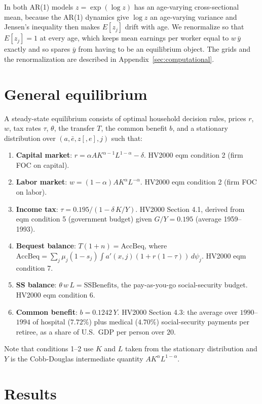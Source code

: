\documentclass[11pt,fleqn]{article}
\begin{document}
In both AR(1) models $z=\exp(\log z)$ has an age-varying cross-sectional mean, because the AR(1) dynamics give $\log z$ an age-varying variance and Jensen's inequality then makes $E[z_j]$ drift with age. We renormalize so that $E[z_j]=1$ at every age, which keeps mean earnings per worker equal to $w\, \bar{y}$ exactly and so spares $\bar{y}$ from having to be an equilibrium object. The grids and the renormalization are described in Appendix~\ref{sec:computational}.


\section{General equilibrium}\label{sec:ge}

A steady-state equilibrium consists of optimal household decision rules, prices $r$, $w$, tax rates $\tau$, $\theta$, the transfer $T$, the common benefit $b$, and a stationary distribution over $(a,\bar{e},z[,e],j)$ such that:

\begin{enumerate}
 \item \textbf{Capital market}: $r = \alpha A K^{\alpha-1} L^{1-\alpha} - \delta$. HV2000 eqm condition 2 (firm FOC on capital).
 \item \textbf{Labor market}: $w = (1-\alpha) A K^{\alpha} L^{-\alpha}$. HV2000 eqm condition 2 (firm FOC on labor).
 \item \textbf{Income tax}: $\tau = 0.195 / (1 - \delta\, K/Y)$. HV2000 Section 4.1, derived from eqm condition 5 (government budget) given $G/Y = 0.195$ (average 1959--1993).
 \item \textbf{Bequest balance}: $T(1+n) = \text{AccBeq}$, where $\text{AccBeq} = \sum_j \mu_j (1-s_j) \int a'(x,j) (1 + r(1-\tau))\,d\psi_j$. HV2000 eqm condition 7.
 \item \textbf{SS balance}: $\theta\, w\, L = \text{SSBenefits}$, the pay-as-you-go social-security budget. HV2000 eqm condition 6.
 \item \textbf{Common benefit}: $b = 0.1242\, Y$. HV2000 Section 4.3: the average over $1990$--$1994$ of hospital ($7.72\%$) plus medical ($4.70\%$) social-security payments per retiree, as a share of U.S.\ GDP per person over $20$.
\end{enumerate}

Note that conditions 1--2 use $K$ and $L$ taken from the stationary distribution and $Y$ is the Cobb-Douglas intermediate quantity $A K^\alpha L^{1-\alpha}$.


\section{Results}\label{sec:results}
\end{document}
